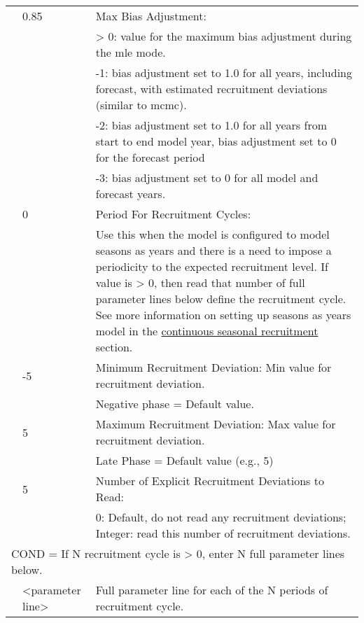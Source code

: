 \begin{longtable}{p{1cm} p{3cm} p{12cm}}
	\Tstrut & 0.85 & Max Bias Adjustment: \\
			&	   & > 0: value for the maximum bias adjustment during the \gls{mle} mode. \\
			& 	   & -1: bias adjustment set to 1.0 for all years, including forecast, with estimated recruitment deviations (similar to \gls{mcmc}). \\
			& 	   & -2: bias adjustment set to 1.0 for all years from start to end model year, bias adjustment set to 0 for the forecast period \\
			& 	   & -3: bias adjustment set to 0 for all model and forecast years. \\

	\Tstrut & 0    & Period For Recruitment Cycles: \\
			&      & Use this when the model is configured to model seasons as years and there is a need to impose a periodicity to the expected recruitment level. If value is > 0, then read that number of full parameter lines below define the recruitment cycle. See more information on setting up seasons as years model in the \hyperlink{continuous-seasonal-recruitment-sec}{continuous seasonal recruitment} section. \\
	
	\Tstrut & -5   & Minimum Recruitment Deviation: Min value for recruitment deviation. \\
			&	   & Negative phase = Default value. \\

	\Tstrut & 5	   & Maximum Recruitment Deviation: Max value for recruitment deviation. \\
			&	   & Late Phase = Default value (e.g., 5) \\
	
	\Tstrut & 5   & Number of Explicit Recruitment Deviations to Read: \\
			&      & 0: Default, do not read any recruitment deviations; Integer: read this number of recruitment deviations. \\

	\multicolumn{3}{l}{COND = If N recruitment cycle is > 0, enter N full parameter lines below.} \Tstrut\\
	\Tstrut & <parameter line> & Full parameter line for each of the N periods of recruitment cycle. \Bstrut\\
	\hline


\end{longtable}
